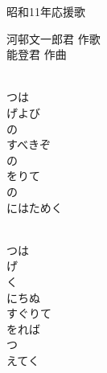 \documentclass[10pt,b5j]{tarticle} %
\begin{document}
\begin{minipage}[c]{0.7\hsize} %
    \begin{center}
        {\LARGE
            昭和11年応援歌 %
        }
        {\small 
        }
    \end{center}
\end{minipage}
\begin{minipage}[c]{0.3\hsize} %
    \begin{flushright} %
        河邨文一郎君 作歌\\能登君 作曲 %
    \end{flushright}
\end{minipage}

\vspace{1.5em} %
\newcommand{\linespace}{0.5em} %
\newcommand{\blocksize}{0.5\hsize} %
\newcommand{\itemmargin}{6em} %
\begin{enumerate} %
    \setlength{\itemindent}{\itemmargin} %
    \begin{minipage}[c]{\blocksize}
    
        \vspace{\linespace}
        \item~\\
        つは\\
        げよび\\
        の\\
        すべきぞ\\
        の\\
        をりて\\
        の\\
        にはためく
        
        \vspace{\linespace}
        \item~\\
        つは\\
        げ\\
        く\\
        にちぬ\\
        すぐりて\\
        をれば\\
        つ\\
        えてく
    
    \end{minipage}
\end{enumerate} %
\end{document}
